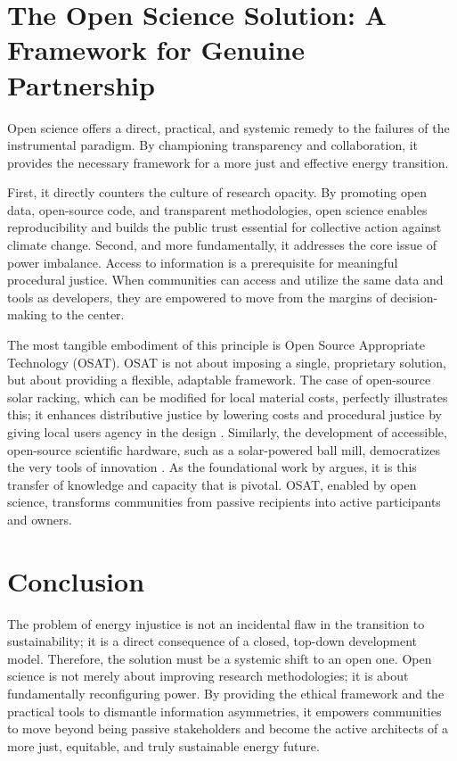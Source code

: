 \documentclass[12pt, letterpaper]{article}
\begin{document}
\section*{The Open Science Solution: A Framework for Genuine Partnership}

Open science offers a direct, practical, and systemic remedy to the failures of the instrumental paradigm. By championing transparency and collaboration, it provides the necessary framework for a more just and effective energy transition.

First, it directly counters the culture of research opacity. By promoting open data, open-source code, and transparent methodologies, open science enables reproducibility and builds the public trust essential for collective action against climate change. Second, and more fundamentally, it addresses the core issue of power imbalance. Access to information is a prerequisite for meaningful procedural justice. When communities can access and utilize the same data and tools as developers, they are empowered to move from the margins of decision-making to the center.

The most tangible embodiment of this principle is Open Source Appropriate Technology (OSAT). OSAT is not about imposing a single, proprietary solution, but about providing a flexible, adaptable framework. The case of open-source solar racking, which can be modified for local material costs, perfectly illustrates this; it enhances distributive justice by lowering costs and procedural justice by giving local users agency in the design \citep{rana2023}. Similarly, the development of accessible, open-source scientific hardware, such as a solar-powered ball mill, democratizes the very tools of innovation \citep{mottaghi2023}. As the foundational work by \citet{pierce2019} argues, it is this transfer of knowledge and capacity that is pivotal. OSAT, enabled by open science, transforms communities from passive recipients into active participants and owners.

\section*{Conclusion}

The problem of energy injustice is not an incidental flaw in the transition to sustainability; it is a direct consequence of a closed, top-down development model. Therefore, the solution must be a systemic shift to an open one. Open science is not merely about improving research methodologies; it is about fundamentally reconfiguring power. By providing the ethical framework and the practical tools to dismantle information asymmetries, it empowers communities to move beyond being passive stakeholders and become the active architects of a more just, equitable, and truly sustainable energy future.



\end{document}
